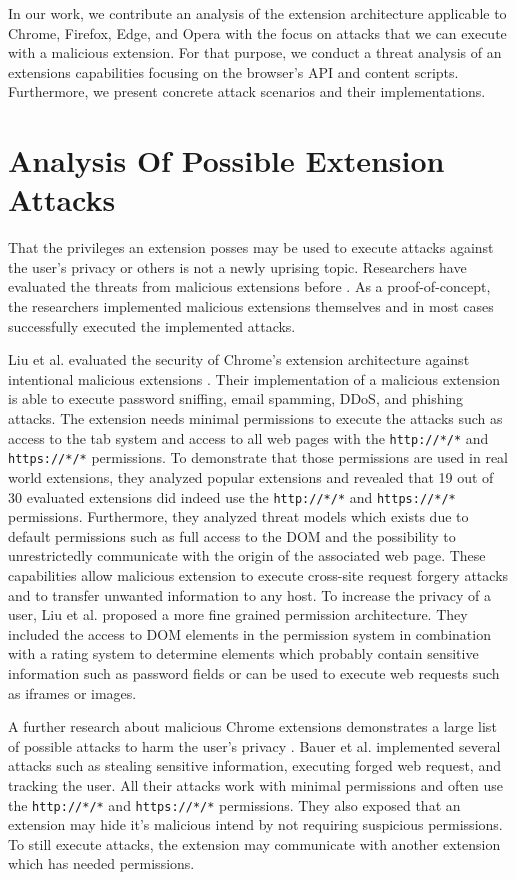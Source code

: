	In our work, we contribute an analysis of the extension architecture applicable to Chrome, Firefox, Edge, and Opera with the focus on attacks that we can execute with a malicious extension. For that purpose, we conduct a threat analysis of an extensions capabilities focusing on the browser's API and content scripts. Furthermore, we present concrete attack scenarios and their implementations. %
	
	
\section{Analysis Of Possible Extension Attacks}

	That the privileges an extension posses may be used to execute attacks against the user's privacy or others is not a newly uprising topic. Researchers have evaluated the threats from malicious extensions before \cite{Liu12chromeextensions:, extensions:cns14}. As a proof-of-concept, the researchers implemented malicious extensions themselves and in most cases successfully executed the implemented attacks. 
	
	Liu et al. evaluated the security of Chrome's extension architecture against intentional malicious extensions \cite{Liu12chromeextensions:}. Their implementation of a malicious extension is able to execute password sniffing, email spamming, DDoS, and phishing attacks. The extension needs minimal permissions to execute the attacks such as access to the tab system and access to all web pages with the \texttt{http://*/*} and \texttt{https://*/*} permissions. To demonstrate that those permissions are used in real world extensions, they analyzed popular extensions and revealed that 19 out of 30 evaluated extensions did indeed use the \texttt{http://*/*} and \texttt{https://*/*} permissions. Furthermore, they analyzed threat models which exists due to default permissions such as full access to the DOM and the possibility to unrestrictedly communicate with the origin of the associated web page. These capabilities allow malicious extension to execute cross-site request forgery attacks and to transfer unwanted information to any host. To increase the privacy of a user, Liu et al. proposed a more fine grained permission architecture. They included the access to DOM elements in the permission system in combination with a rating system to determine elements which probably contain sensitive information such as password fields or can be used to execute web requests such as iframes or images. 
	
	A further research about malicious Chrome extensions demonstrates a large list of possible attacks to harm the user's privacy \cite{extensions:cns14}. Bauer et al. implemented several attacks such as stealing sensitive information, executing forged web request, and tracking the user. All their attacks work with minimal permissions and often use the \texttt{http://*/*} and \texttt{https://*/*} permissions. They also exposed that an extension may hide it's malicious intend by not requiring suspicious permissions. To still execute attacks, the extension may communicate with another extension which has needed permissions. 
	
